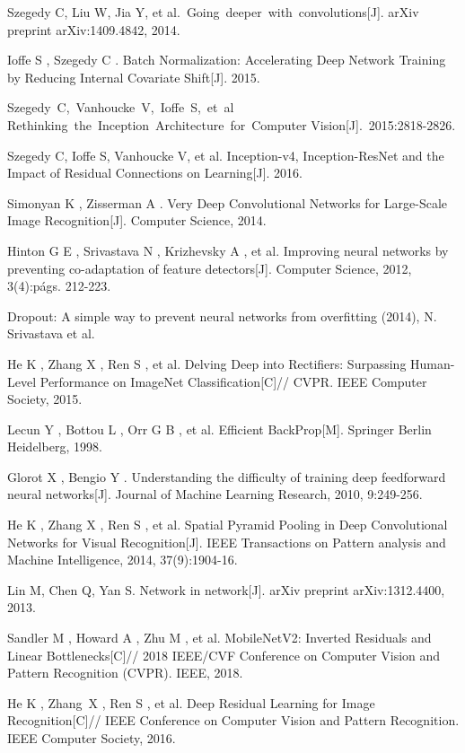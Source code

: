 \documentclass[15pt]{article}
\begin{document}
\begin{thebibliography}{99}
 Szegedy C, Liu W, Jia Y, et al. Going deeper with convolutions[J]. arXiv preprint arXiv:1409.4842, 2014.

 Ioffe S , Szegedy C . Batch Normalization: Accelerating Deep Network Training by Reducing Internal Covariate Shift[J]. 2015.

 Szegedy C, Vanhoucke V, Ioffe S, et al Rethinking the Inception Architecture for Computer Vision[J]. 2015:2818-2826.

 Szegedy C, Ioffe S, Vanhoucke V, et al. Inception-v4, Inception-ResNet and the Impact of Residual Connections on Learning[J]. 2016.

 Simonyan K , Zisserman A . Very Deep Convolutional Networks for Large-Scale Image Recognition[J]. Computer Science, 2014.

 Hinton G E , Srivastava N , Krizhevsky A , et al. Improving neural networks by preventing co-adaptation of feature detectors[J]. Computer Science, 2012, 3(4):págs. 212-223.

 Dropout: A simple way to prevent neural networks from overfitting (2014), N. Srivastava et al.

 He K , Zhang X , Ren S , et al. Delving Deep into Rectifiers: Surpassing Human-Level Performance on ImageNet Classification[C]// CVPR. IEEE Computer Society, 2015.

 Lecun Y , Bottou L , Orr G B , et al. Efficient BackProp[M]. Springer Berlin Heidelberg, 1998.

 Glorot X , Bengio Y . Understanding the difficulty of training deep feedforward neural networks[J]. Journal of Machine Learning Research, 2010, 9:249-256.

 He K , Zhang X , Ren S , et al. Spatial Pyramid Pooling in Deep Convolutional Networks for Visual Recognition[J]. IEEE Transactions on Pattern analysis and Machine Intelligence, 2014, 37(9):1904-16.

 Lin M, Chen Q, Yan S. Network in network[J]. arXiv preprint arXiv:1312.4400, 2013.

 Sandler M , Howard A , Zhu M , et al. MobileNetV2: Inverted Residuals and Linear Bottlenecks[C]// 2018 IEEE/CVF Conference on Computer Vision and Pattern Recognition (CVPR). IEEE, 2018.

 He K , Zhang X , Ren S , et al. Deep Residual Learning for Image Recognition[C]// IEEE Conference on Computer Vision and Pattern Recognition. IEEE Computer Society, 2016.


\end{thebibliography}
\end{document}
